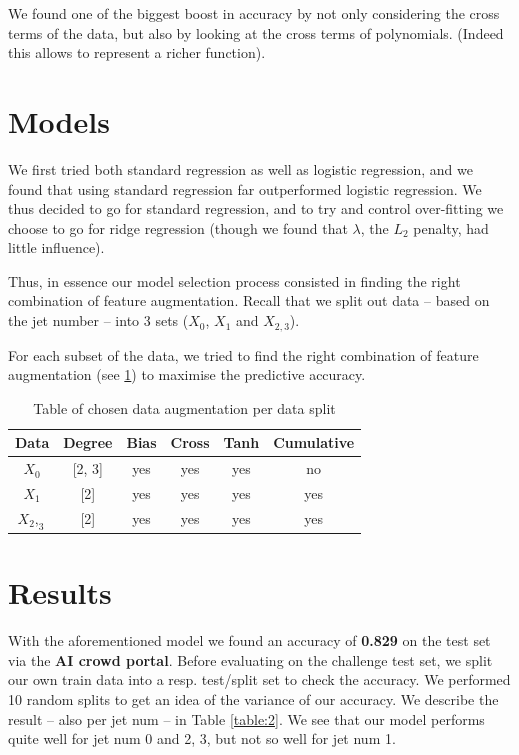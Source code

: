 \documentclass[10pt,conference,compsocconf]{IEEEtran}
\begin{document}
We found one of the biggest boost in accuracy by not only considering the cross terms of the data, but also by looking at the cross terms of polynomials. (Indeed this allows to represent a richer function).

\section{Models}

We first tried both standard regression as well as logistic regression, and we found that using standard regression far outperformed logistic regression. We thus decided to go for standard regression, and to try and control over-fitting we choose to go for ridge regression (though we found that $\lambda$, the $L_2$ penalty, had little influence).

Thus, in essence our model selection process consisted in finding the right combination of feature augmentation. Recall that we split out data -- based on the jet number -- into 3 sets ($X_0$, $X_1$ and $X_{2,3}$).

For each subset of the data, we tried to find the right combination of feature augmentation (see \ref{table:1}) to maximise the predictive accuracy. 
 
\begin{table}[h!]
\centering
\begin{tabular}{||c c c c c c||} 
 \hline
 Data & Degree & Bias & Cross & Tanh & Cumulative\\ [0.5ex] 
 \hline\hline
 $X_0$ & [2, 3] & yes & yes & yes & no \\ 
 $X_1$ & [2] & yes & yes & yes & yes \\
 $X_2,_3$ & [2] & yes & yes & yes & yes \\

 \hline
\end{tabular}
\caption{Table of chosen data augmentation per data split}
\label{table:1}
\end{table}


\section{Results}

With the aforementioned model we found an accuracy of \textbf{0.829} on the test set via the \textbf{AI crowd portal}. Before evaluating on the challenge test set, we split our own train data into a resp. test/split set to check the accuracy. We performed 10 random splits to get an idea of the variance of our accuracy. We describe the result -- also per jet num -- in Table \ref{table:2}. We see that our model performs quite well for jet num 0 and 2, 3, but not so well for jet num 1.
\end{document}
